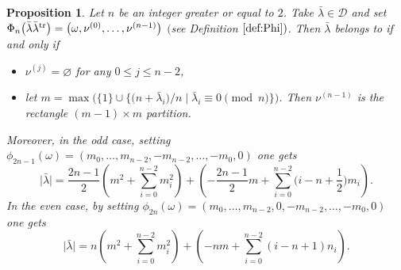 \documentclass[10pt,a4paper]{article}
\newtheorem{Proposition}[Theorem]{Proposition}
 { \theoremstyle{definition}
\newtheorem{Definition}[Theorem]{Definition}
\newtheorem{Note}[Theorem]{Note}
\newtheorem{Example}[Theorem]{Example}
\newtheorem{Remark}[Theorem]{Remark} }
\numberwithin{equation}{section}
\newcommand{\cC}{\mathcal{C}}
\def\cch{\mathcal H}
\def\ccdd{\mathcal {DD}}
\def\ccd{\mathcal {D}}
\newcommand{\N}{\mathbb{N}}
\begin{document}
\begin{Proposition}
	\label{prop:ddprime} Let $n$ be an integer greater or equal to $2$. Take $%
	\bar{\lambda}\in \ccd$ and set $\Phi _{n}\bigl(\bar{\lambda}\bar{\lambda}^{%
		\mathrm{tr}}\bigr)=\smash{\bigl( \omega ,\nu ^{(0)},\dots ,\nu ^{(n-1)}\bigr)} $ $($see
	Definition $\ref{def:Phi})$. Then $\bar{\lambda}$ belongs to \smash{$\cC_{n}^{d,%
		\mathrm{tr},r}$} if and only if
	\begin{itemize}\itemsep=0pt
		\item $\nu^{(j)}=\varnothing$ for any $0\leq j\leq n-2$,
		
		\item let $m=\max\bigl(\lbrace 1\rbrace\cup\bigl\lbrace\bigl(n+\bar{\lambda}_i\bigr)/n \mid
		\bar{\lambda}_i\equiv 0\pmod{n}\bigr\rbrace\bigr)$. Then $\nu^{(n-1)}$ is the rectangle
		${(m-1)\times m}$ partition.
	\end{itemize}
	
	Moreover, in the odd case, setting $\phi _{2n-1}(\omega )=(m_{0},\dots
	,m_{n-2},-m_{n-2},\dots ,-m_{0},0)$ one gets%
	\begin{equation}
	\bigl\lvert \bar{\lambda}\bigr\rvert =\frac{2n-1}{2}\left(
	m^{2}+\sum_{i=0}^{n-2}m_{i}^{2}\right) +\left( -\frac{2n-1}{2}%
	m+\sum_{i=0}^{n-2}\biggl(i-n+\frac{1}{2}\biggr)m_{i}\right) . \label{eq:gkddnuimpair}
	\end{equation}%
	In the even case, by setting $\phi _{2n}(\omega )=(m_{0},\dots
	,m_{n-2},0,-m_{n-2},\dots ,-m_{0},0)$ one gets%
	\begin{equation}
	\bigl\lvert \bar{\lambda}\bigr\rvert =n\left( m^{2}+\sum_{i=0}^{n-2}m_{i}^{2}\right)
	+\left( -nm+\sum_{i=0}^{n-2}(i-n+1)n_{i}\right) .
	\label{eq:gkddnupairbvtquot}
	\end{equation}%
\end{Proposition}
\end{document}
